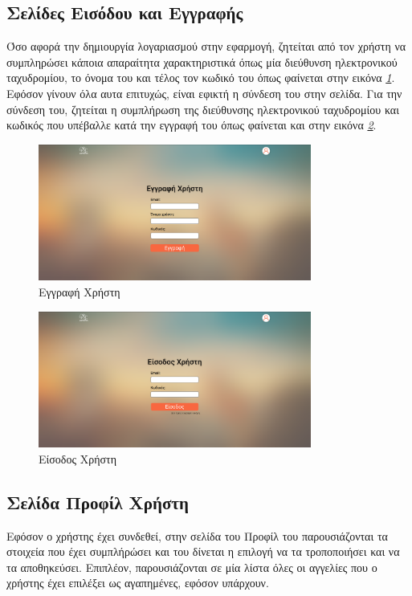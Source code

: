 \documentclass[manuscript,screen,review, language=greek, language=english]{acmart}
\begin{document}
\subsection{Σελίδες Εισόδου και Εγγραφής}
	Όσο αφορά την δημιουργία λογαριασμού στην εφαρμογή, ζητείται από τον χρήστη να
	συμπληρώσει κάποια απαραίτητα χαρακτηριστικά όπως μία διεύθυνση ηλεκτρονικού
	ταχυδρομίου, το όνομα του και τέλος τον κωδικό του όπως φαίνεται στην εικόνα
	\emph{\ref{fig:sign_up}}. Εφόσον γίνουν όλα αυτα επιτυχώς, είναι εφικτή η σύνδεση
	του στην σελίδα. Για την σύνδεση του, ζητείται η συμπλήρωση της διεύθυνσης
	ηλεκτρονικού ταχυδρομίου και κωδικός που υπέβαλλε κατά την εγγραφή του όπως φαίνεται
	και στην εικόνα \emph{\ref{fig:sign_in}}.

	\begin{figure}[H]
		   \includegraphics[width=0.8\textwidth]{sign_up_page.png}
		   \caption{Εγγραφή Χρήστη}
		   \label{fig:sign_up}
	\end{figure}

	\begin{figure}[H]
		   \includegraphics[width=0.8\textwidth]{sign_in_page.png}
		   \caption{Είσοδος Χρήστη}
		   \label{fig:sign_in}
	\end{figure}

\subsection{Σελίδα Προφίλ Χρήστη}
	Εφόσον ο χρήστης έχει συνδεθεί, στην σελίδα του Προφίλ του παρουσιάζονται τα στοιχεία
	που έχει συμπλήρώσει και του δίνεται η επιλογή να τα τροποποιήσει και να τα
	αποθηκεύσει. Επιπλέον, παρουσιάζονται σε μία λίστα όλες οι αγγελίες που ο χρήστης
	έχει επιλέξει ως αγαπημένες, εφόσον υπάρχουν.
\end{document}
